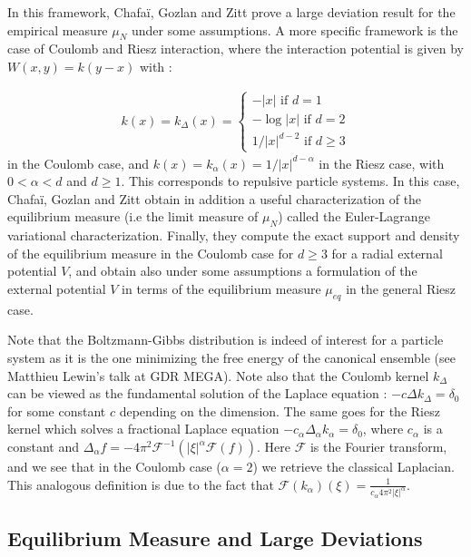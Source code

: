 \documentclass[a4paper,12pt]{report}
\begin{document}
In this framework, Chafaï, Gozlan and Zitt prove a large deviation result for the empirical measure $\mu_{N}$ under some assumptions. A more specific framework is the case of Coulomb and Riesz interaction, where the interaction potential is given by $W(x, y) = k(y - x)$ with :

\begin{align*}
    k(x) = k_{\Delta}(x) = \left\{\begin{array}{c}
	-\lvert x \rvert \text{  if $d = 1$}\\
	- \log \lvert x \rvert  \text{  if $d = 2$}\\
 	1/\lvert x \rvert^{d-2} \text{  if $d \geq 3$}
\end{array}\right.
\end{align*}
in the Coulomb case, and $k(x) = k_{\alpha}(x) = 1/\lvert x\rvert^{d-\alpha}$ in the Riesz case, with $0 < \alpha < d$ and $d\geq 1$. This corresponds to repulsive particle systems. In this case, Chafaï, Gozlan and Zitt obtain in addition a useful characterization of the equilibrium measure (i.e the limit measure of $\mu_{N}$) called the Euler-Lagrange variational characterization. Finally, they compute the exact support and density of the equilibrium measure in the Coulomb case for $d\geq 3$ for a radial external potential $V$, and obtain also under some assumptions a formulation of the external potential $V$ in terms of the equilibrium measure $\mu_{eq}$ in the general Riesz case.
\vspace{0.5cm}

Note that the Boltzmann-Gibbs distribution is indeed of interest for a particle system as it is the one minimizing the free energy of the canonical ensemble (see Matthieu Lewin's talk at GDR MEGA). Note also that the Coulomb kernel $k_{\Delta}$ can be viewed as the fundamental solution of the Laplace equation : $-c \Delta k_{\Delta} = \delta_{0}$ for some constant $c$ depending on the dimension. The same goes for the Riesz kernel which solves a fractional Laplace equation $-c_{\alpha} \Delta_{\alpha} k_{\alpha} = \delta_{0}$, where $c_{\alpha}$ is a constant and $\Delta_{\alpha} f = -4\pi^{2} \mathcal{F}^{-1}\left(\lvert \xi\rvert^{\alpha} \mathcal{F}(f)\right)$. Here $\mathcal{F}$ is the Fourier transform, and we see that in the Coulomb case ($\alpha = 2$) we retrieve the classical Laplacian. This analogous definition is due to the fact that $\mathcal{F}(k_{\alpha})(\xi) = \frac{1}{c_{\alpha} 4\pi^{2}\lvert \xi\rvert^{\alpha}}$.

\subsection{Equilibrium Measure and Large Deviations}
\end{document}
